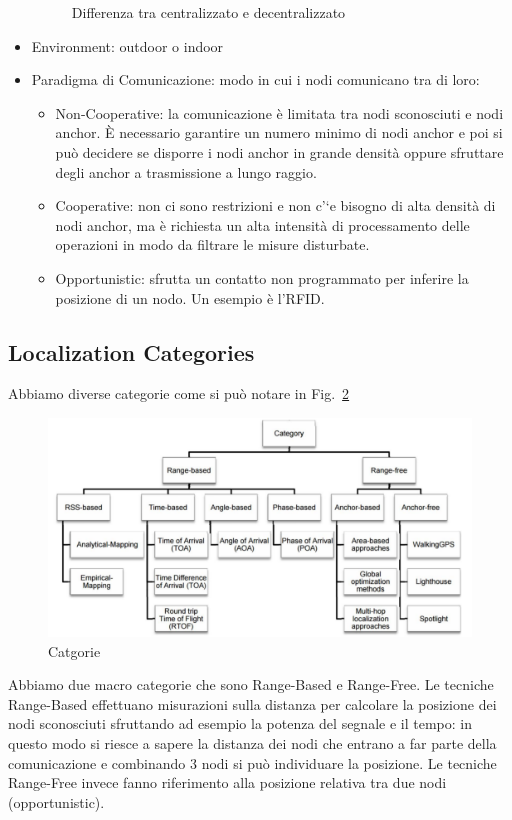 \documentclass[12pt,a4paper]{article}
\begin{document}
\begin{itemize}
\begin{figure}
			\caption{Differenza tra centralizzato e decentralizzato}
			\label{fig:fig2-lec3pt1.png}
		\end{figure}			
		\item Environment: outdoor o indoor
		\item Paradigma di Comunicazione: modo in cui i nodi comunicano tra di loro:
		\begin{itemize}
			\item Non-Cooperative: la comunicazione è limitata tra nodi sconosciuti e nodi anchor. È necessario garantire un numero minimo di nodi anchor e poi si può decidere se disporre i nodi anchor in grande densità oppure sfruttare degli anchor a trasmissione a lungo raggio.
			\item Cooperative: non ci sono restrizioni e non c'`e bisogno di alta densità di nodi anchor, ma è richiesta un alta intensità di processamento delle operazioni in modo da filtrare le misure disturbate.
			\item Opportunistic: sfrutta un contatto non programmato per inferire la posizione di un nodo. Un esempio è l'RFID.
		\end{itemize}
	\end{itemize}
	
	\subsection{Localization Categories}\label{subsec3.4}
	Abbiamo diverse categorie come si può notare in Fig.~\ref{fig:fig3-lec3pt1}
	\begin{figure}
		\centering
		\includegraphics[scale=0.6]{fig3-lec3pt1.png}
		\caption{Catgorie}
		\label{fig:fig3-lec3pt1}
	\end{figure}
	Abbiamo due macro categorie che sono Range-Based e Range-Free.
	Le tecniche Range-Based effettuano misurazioni sulla distanza per calcolare la posizione dei nodi sconosciuti sfruttando ad esempio la potenza del segnale e il tempo: in questo modo si riesce a sapere la distanza dei nodi che entrano a far parte della comunicazione e combinando 3 nodi si può individuare la posizione. Le tecniche Range-Free invece fanno riferimento alla posizione relativa tra due nodi (opportunistic).
\end{document}

